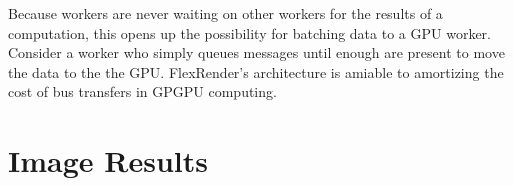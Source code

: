\documentclass[12pt]{ucthesis}
\begin{document}
Because workers are never waiting on other workers for the results of a
computation, this opens up the possibility for batching data to a GPU worker.
Consider a worker who simply queues messages until enough are present to move
the data to the the GPU. FlexRender's architecture is amiable to amortizing
the cost of bus transfers in GPGPU computing.

\clearpage



\section*{Image Results}
\end{document}
